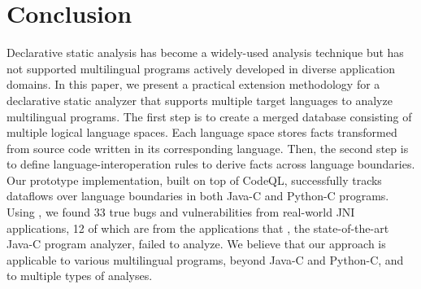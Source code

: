 \section{Conclusion}\label{sec:conclude}
Declarative static analysis has become a widely-used analysis technique but
has not supported multilingual programs actively developed in diverse
application domains.
In this paper, we present a practical extension methodology for a declarative static
analyzer that supports multiple target languages to analyze multilingual programs.
The first step is to create a merged database consisting of multiple logical language
spaces. Each language space stores facts transformed from source code written in its
corresponding language.
Then, the second step is to define language-interoperation rules to derive facts
across language boundaries.
Our prototype implementation, \ours built on top of CodeQL, successfully tracks dataflows
over language boundaries in both Java-C and Python-C programs.
Using \ours, we found 33 true bugs and vulnerabilities from real-world
JNI applications, 12 of which are from the applications that \lees,
the state-of-the-art Java-C program analyzer, failed to analyze.
We believe that our approach is applicable to various multilingual programs,
beyond Java-C and Python-C, and to multiple types of analyses.

